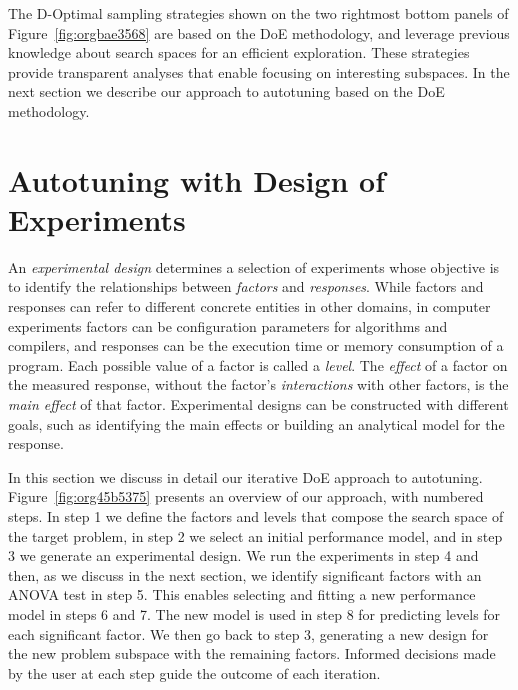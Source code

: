 \documentclass[conference]{IEEEtran}
\begin{document}
The D-Optimal  sampling strategies shown on  the two rightmost bottom  panels of
Figure~\ref{fig:orgbae3568} are  based on  the DoE methodology,  and leverage
previous  knowledge about  search spaces  for an  efficient exploration.   These
strategies  provide transparent  analyses  that enable  focusing on  interesting
subspaces. In the  next section we describe our approach  to autotuning based on
the DoE methodology.
\section{Autotuning with Design of Experiments}
\label{sec:orgb6938f2}
An \emph{experimental design} determines a  selection of experiments whose objective is
to identify the  relationships between \emph{factors} and \emph{responses}.  While factors and
responses can refer to different concrete entities in other domains, in computer
experiments  factors   can  be  configuration  parameters   for  algorithms  and
compilers, and  responses can be the  execution time or memory  consumption of a
program. Each  possible value of  a factor  is called a  \emph{level}. The \emph{effect}  of a
factor on  the measured response,  without the factor's \emph{interactions}  with other
factors,  is  the \emph{main  effect}  of  that  factor.  Experimental designs  can  be
constructed  with different  goals,  such  as identifying  the  main effects  or
building an analytical model for the response.

In this section  we discuss in detail our iterative  DoE approach to autotuning.
Figure~\ref{fig:org45b5375}  presents  an  overview   of  our  approach,  with
numbered steps.  In step  1 we define  the factors and  levels that  compose the
search space of the  target problem, in step 2 we  select an initial performance
model, and in step 3 we generate  an experimental design. We run the experiments
in step 4 and  then, as we discuss in the next  section, we identify significant
factors with an ANOVA  test in step 5. This enables selecting  and fitting a new
performance  model in  steps 6  and  7. The  new model  is  used in  step 8  for
predicting  levels for  each significant  factor.  We then  go back  to step  3,
generating a new design for the new problem subspace with the remaining factors.
Informed decisions  made by  the user  at each  step guide  the outcome  of each
iteration.
\end{document}
